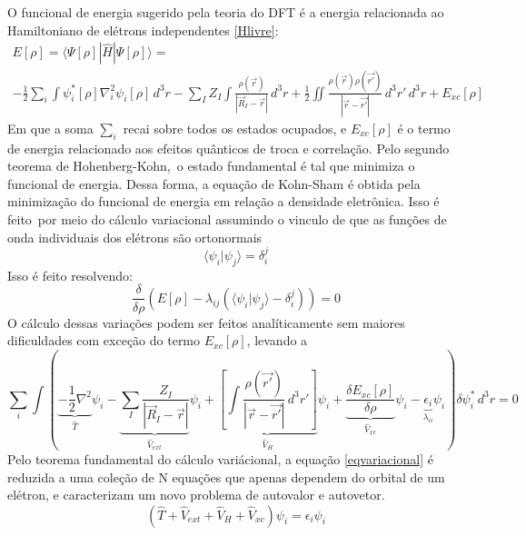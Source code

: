 O funcional de energia sugerido pela teoria do DFT é a energia relacionada ao Hamiltoniano de elétrons independentes \ref{Hlivre}:
\begin{gather}
    \label{funcdft}
    E[\rho] = \langle\Psi[\rho]| \hat H | \Psi[\rho] \rangle = \nonumber \\
    -\frac{1}{2}\sum_i \int \psi_i^*[\rho] \nabla^2_i \psi_i[\rho] \, d^3r - \sum_{I} Z_I\int \frac{\rho(\vec{r})}{|\vec{R}_I - \vec{r}|} \, d^3r + \frac{1}{2}\iint \frac{\rho(\vec{r})\rho(\vec{r'})}{|\vec{r}-\vec{r'}|} \, d^3r' \, d^3r + E_{xc}[\rho]
\end{gather}
Em que a soma $\sum_i$ recai sobre todos os estados ocupados, e $E_{xc}[\rho]$ é o termo de energia relacionado aos efeitos quânticos de troca e correlação. Pelo segundo teorema de Hohenberg-Kohn,\
o estado fundamental é tal que minimiza o funcional de energia. Dessa forma, a equação de Kohn-Sham é obtida pela minimização do funcional de energia em relação a densidade eletrônica. Isso é feito\
por meio do cálculo variacional assumindo o vinculo de que as funções de onda individuais dos elétrons são ortonormais
\begin{equation}
    \langle \psi_i| \psi_j \rangle = \delta_{i}^j
\end{equation}
Isso é feito resolvendo:
\begin{equation}
    \frac{\delta}{\delta \rho}\left( E[\rho] - \lambda_{ij} \left(\langle \psi_i| \psi_j \rangle - \delta_{i}^j \right)\right) = 0
\end{equation}
O cálculo dessas variações podem ser feitos analíticamente sem maiores dificuldades com exceção do termo $E_{xc}[\rho]$, levando a
\begin{equation}
    \label{eqvariacional}
   \sum_i \int \left( 
   \underbrace{-\frac{1}{2} \nabla^2}_{\hat{T}} \psi_i
   - \underbrace{\sum_I\frac{Z_I}{|\vec{R}_I-\vec{r}|}}_{\hat{V}_{ext}} \psi_i
   + \underbrace{\left[ \int \frac{\rho(\vec{r'})}{|\vec{r} - \vec{r'}|} \, d^3r' \right]}_{\hat{V}_H} \psi_i
   + \underbrace{\frac{\delta E_{xc}[\rho]}{\delta \rho}}_{\hat{V}_{xc}} \psi_i
   - \underbrace{\epsilon_{i}}_{\lambda_{ii}} \psi_i
   \right) \delta \psi_i^* \, d^3r = 0
\end{equation}
Pelo teorema fundamental do cálculo variácional, a equação \ref{eqvariacional} é reduzida a uma coleção de N equações que apenas dependem do orbital de um elétron, e caracterizam um novo problema de autovalor e autovetor.
\begin{equation}
    \left( \hat{T} + \hat V_{ext} + \hat V_{H} + \hat V_{xc} \right) \psi_i = \epsilon_i \psi_i
\end{equation}

